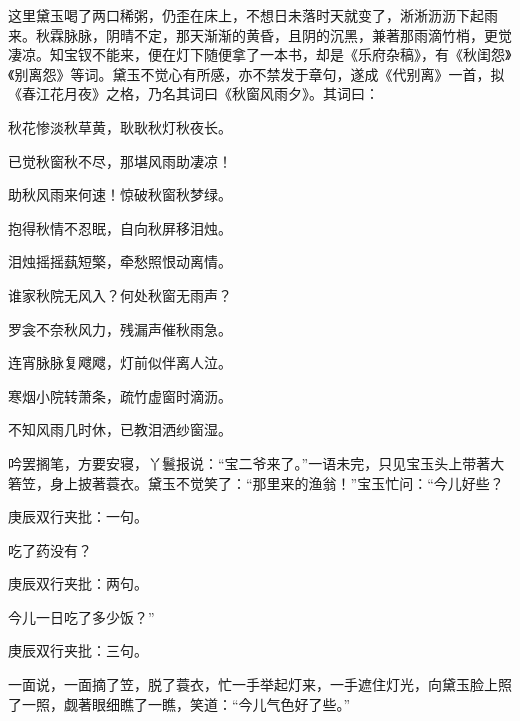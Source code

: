 \begin{parag}
    这里黛玉喝了两口稀粥，仍歪在床上，不想日未落时天就变了，淅淅沥沥下起雨来。秋霖脉脉，阴晴不定，那天渐渐的黄昏，且阴的沉黑，兼著那雨滴竹梢，更觉凄凉。知宝钗不能来，便在灯下随便拿了一本书，却是《乐府杂稿》，有《秋闺怨》《别离怨》等词。黛玉不觉心有所感，亦不禁发于章句，遂成《代别离》一首，拟《春江花月夜》之格，乃名其词曰《秋窗风雨夕》。其词曰：
\end{parag}
\begin{poem}

    \begin{pl}

        秋花惨淡秋草黄，耿耿秋灯秋夜长。
    \end{pl}
    \begin{pl}

        已觉秋窗秋不尽，那堪风雨助凄凉！
    \end{pl}
    \begin{pl}

        助秋风雨来何速！惊破秋窗秋梦绿。
    \end{pl}
    \begin{pl}

        抱得秋情不忍眠，自向秋屏移泪烛。
    \end{pl}
    \begin{pl}

        泪烛摇摇蓺短檠，牵愁照恨动离情。
    \end{pl}
    \begin{pl}

        谁家秋院无风入？何处秋窗无雨声？
    \end{pl}
    \begin{pl}

        罗衾不奈秋风力，残漏声催秋雨急。
    \end{pl}
    \begin{pl}

        连宵脉脉复飕飕，灯前似伴离人泣。
    \end{pl}
    \begin{pl}

        寒烟小院转萧条，疏竹虚窗时滴沥。
    \end{pl}
    \begin{pl}

        不知风雨几时休，已教泪洒纱窗湿。
    \end{pl}
\end{poem}


\begin{parag}
    吟罢搁笔，方要安寝，丫鬟报说：“宝二爷来了。”一语未完，只见宝玉头上带著大箬笠，身上披著蓑衣。黛玉不觉笑了：“那里来的渔翁！”宝玉忙问：“今儿好些？\begin{note}庚辰双行夹批：一句。\end{note}吃了药没有？\begin{note}庚辰双行夹批：两句。\end{note}今儿一日吃了多少饭？”\begin{note}庚辰双行夹批：三句。\end{note}一面说，一面摘了笠，脱了蓑衣，忙一手举起灯来，一手遮住灯光，向黛玉脸上照了一照，觑著眼细瞧了一瞧，笑道：“今儿气色好了些。”
\end{parag}


